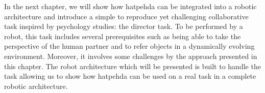 \documentclass[a4paper,11pt,twoside]{StyleThese}
\begin{document}
In the next chapter, we will show how \acrshort{hatpehda} can be integrated into a robotic architecture and introduce a simple to reproduce yet challenging collaborative task inspired by psychology studies: the director task. To be performed by a robot, this task includes several prerequisites such as being able to take the perspective of the human partner and to refer objects in a dynamically evolving environment. Moreover, it involves some challenges by the approach presented in this chapter. The robot architecture which will be presented is built to handle the task allowing us to show how \acrshort{hatpehda} can be used on a real task in a complete robotic architecture.

\ifdefined{}
\else


\end{document}
